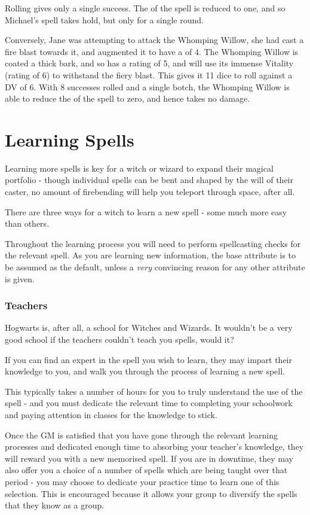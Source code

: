 Rolling  gives only a single success. The  of the spell is reduced to one, and so Michael's spell takes hold, but only for a single round. 

Conversely, Jane was attempting to attack the Whomping Willow, she had cast a \levelThree{} fire blast towards it, and augmented it to have a  of 4. The Whomping Willow is coated a thick bark, and so has a  rating of 5, and will use its immense Vitality (rating of 6) to withstand the fiery blast. This gives it 11 dice to roll against a DV of 6. With 8 successes rolled and a single botch, the Whomping Willow is able to reduce the  of the spell to zero, and hence takes no damage. 


\chapter{Learning Spells}

Learning more spells is key for a witch or wizard to expand their magical portfolio - though individual spells can be bent and shaped by the will of their caster, no amount of firebending will help you teleport through space, after all. 

There are three ways for a witch to learn a new spell - some much more easy than others. 

Throughout the learning process you will need to perform spellcasting checks for the relevant spell. As you are learning new information, the  base attribute is to be assumed as the default, unless a {\it very} convincing reason for any other attribute is given. 

\subsection{Teachers}

Hogwarts is, after all, a school for Witches and Wizards. It wouldn't be a very good school if the teachers couldn't teach you spells, would it? 

If you can find an expert in the spell you wish to learn, they may impart their knowledge to you, and walk you through the process of learning a new spell. 

This typically takes a number of hours for you to truly understand the use of the spell - and you must dedicate the relevant time to completing your schoolwork and paying attention in classes for the knowledge to stick. 

Once the GM is satisfied that you have gone through the relevant learning processes and dedicated enough time to absorbing your teacher's knowledge, they will reward you with a new memorised spell. If you are in downtime, they may also offer you a choice of a number of spells which are being taught over that period - you may choose to dedicate your practice time to learn one of this selection. This is encouraged because it allows your group to diversify the spells that they know as a group. 


